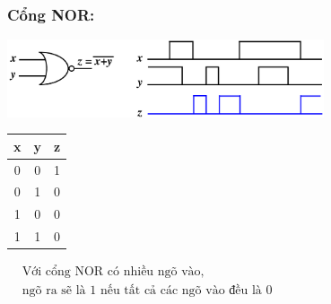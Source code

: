 \subsubsection{Cổng NOR:}
\begin{center}
    \includegraphics[width = 0.7\textwidth]{./local/image/24.png}
\end{center}
\begin{table}[h!]
    \centering
    \begin{tabular}{|cc|c|}
    \hline
    \textbf{x} & \textbf{y} & \textbf{z} \\ \hline
    0          & 0          & 1                      \\
    0          & 1          & 0                      \\
    1          & 0          & 0                      \\
    1          & 1          & 0                      \\ \hline
    \end{tabular} \qquad
    $\begin{aligned}
        &\text{Với cổng NOR có nhiều ngõ vào,}\\
        &\text{ngõ ra sẽ là 1 nếu tất cả các ngõ vào đều là 0}
    \end{aligned}$
\end{table}
